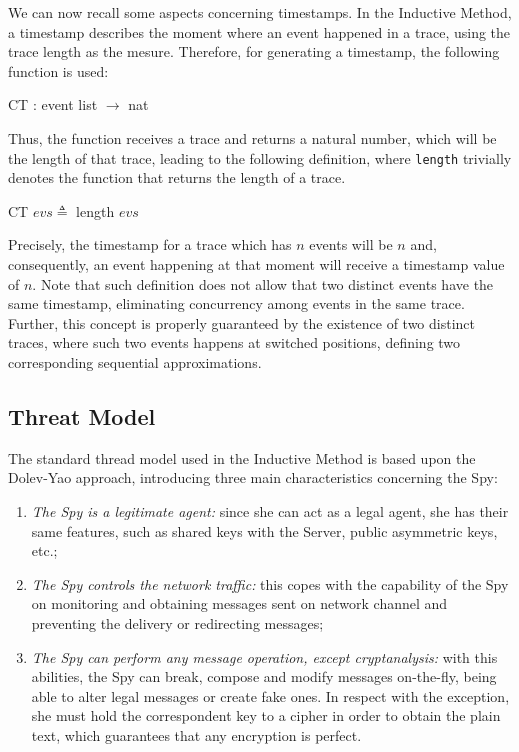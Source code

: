 We can now recall some aspects concerning timestamps. In the Inductive Method, a timestamp describes the moment where an event happened in a trace, using the trace length as the mesure. Therefore, for generating a timestamp, the following function is used:

\begin{center}
  {\ttfamily CT : event list $\longrightarrow$ nat}
\end{center}

Thus, the function receives a trace and returns a natural number, which will be the length of that trace, leading to the following definition, where \texttt{length} trivially denotes the function that returns the length of a trace.

\begin{center}
  {\ttfamily CT $evs \triangleq$ length $evs$}
\end{center}

Precisely, the timestamp for a trace which has $n$ events will be $n$ and, consequently, an event happening at that moment will receive a timestamp value of $n$. Note that such definition does not allow that two distinct events have the same timestamp, eliminating concurrency among events in the same trace. Further, this concept is properly guaranteed by the existence of two distinct traces, where such two events happens at switched positions, defining two corresponding sequential approximations.


\subsection{Threat Model}
\label{ssec:threat-model}
The standard thread model used in the Inductive Method is based upon the Dolev-Yao \cite{DolevYao81} approach, introducing three main characteristics concerning the Spy:

\begin{enumerate}
  \item \textit{The Spy is a legitimate agent:} since she can act as a legal agent, she has their same features, such as shared keys with the Server, public asymmetric keys, etc.;

  \item \textit{The Spy controls the network traffic:} this copes with the capability of the Spy on monitoring and obtaining messages sent on network channel and  preventing the delivery or redirecting messages;

  \item \textit{The Spy can perform any message operation, except cryptanalysis:} with this abilities, the Spy can break, compose and modify messages on-the-fly, being able to alter legal messages or create fake ones. In respect with the exception, she must hold the correspondent key to a cipher in order to obtain the plain text, which guarantees that any encryption is perfect.
\end{enumerate}

